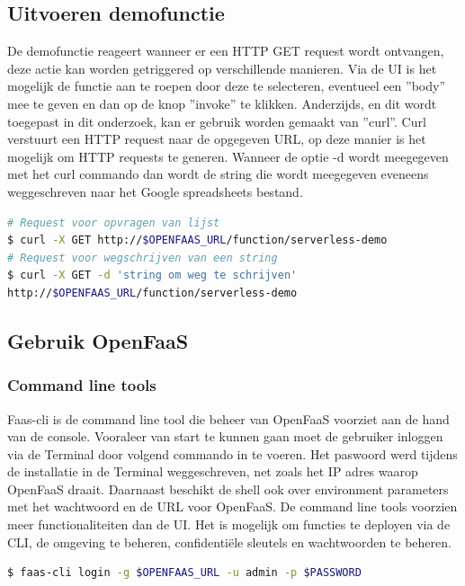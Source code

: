 \subsection{Uitvoeren demofunctie}
\label{sec:openfaas-uitvoeren-functie}
De demofunctie reageert wanneer er een HTTP GET request wordt ontvangen, deze actie kan worden getriggered op verschillende manieren. Via de UI is het mogelijk de functie aan te roepen door deze te selecteren, eventueel een ''body'' mee te geven en dan op de knop ''invoke'' te klikken. Anderzijds, en dit wordt toegepast in dit onderzoek, kan er gebruik worden gemaakt van ''curl''. Curl verstuurt een HTTP request naar de opgegeven URL, op deze manier is het mogelijk om HTTP requests te generen. Wanneer de optie -d wordt meegegeven met het curl commando dan wordt de string die wordt meegegeven eveneens weggeschreven naar het Google spreadsheets bestand.

\begin{lstlisting}[language=bash]
# Request voor opvragen van lijst
$ curl -X GET http://$OPENFAAS_URL/function/serverless-demo
# Request voor wegschrijven van een string
$ curl -X GET -d 'string om weg te schrijven' 
http://$OPENFAAS_URL/function/serverless-demo
\end{lstlisting}

\subsection{Gebruik OpenFaaS}
\subsubsection{Command line tools}
Faas-cli is de command line tool die beheer van OpenFaaS voorziet aan de hand van de console. Vooraleer van start te kunnen gaan moet de gebruiker inloggen via de Terminal door volgend commando in te voeren. Het paswoord werd tijdens de installatie in de Terminal weggeschreven, net zoals het IP adres waarop OpenFaaS draait. Daarnaast beschikt de shell ook over environment parameters met het wachtwoord en de URL voor OpenFaaS. De command line tools voorzien meer functionaliteiten dan de UI. Het is mogelijk om functies te deployen via de CLI, de omgeving te beheren, confidentiële sleutels en wachtwoorden te beheren.
\begin{lstlisting}[language=bash]
$ faas-cli login -g $OPENFAAS_URL -u admin -p $PASSWORD
\end{lstlisting}

